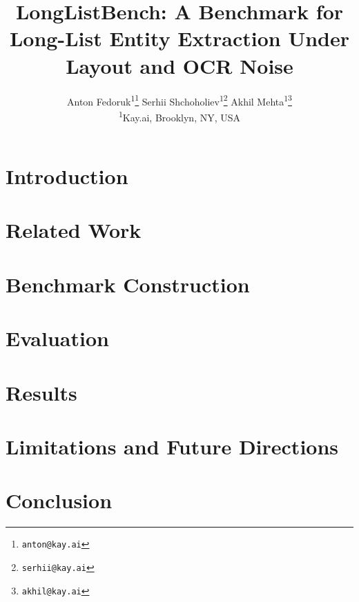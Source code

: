 \documentclass[12pt]{article}
\title{LongListBench: A Benchmark for Long-List Entity Extraction Under Layout and OCR Noise}
\author{
    Anton Fedoruk\textsuperscript{1}\thanks{\texttt{anton@kay.ai}}
    \hspace{2em}
    Serhii Shchoholiev\textsuperscript{1}\thanks{\texttt{serhii@kay.ai}}
    \hspace{2em}
    Akhil Mehta\textsuperscript{1}\thanks{\texttt{akhil@kay.ai}}
    \\[1em]
    \normalsize\textsuperscript{1}Kay.ai, Brooklyn, NY, USA
}
\date{}
\theoremstyle{definition}
\theoremstyle{remark}
\begin{document}
\maketitle

\begin{abstract}

\end{abstract}

\section{Introduction}
\label{sec:introduction}


\section{Related Work}
\label{sec:related-work}


\section{Benchmark Construction}
\label{sec:methodology}


\section{Evaluation}
\label{sec:evaluation}


\section{Results}
\label{sec:results}


\section{Limitations and Future Directions}
\label{sec:limitations}


\section{Conclusion}
\label{sec:conclusion}


% 

\printbibliography

\newpage

\end{document}
